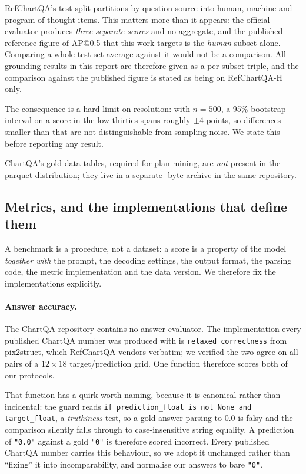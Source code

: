 RefChartQA's test split partitions by question source into  human, 
machine and  program-of-thought items. This matters more than it appears: the
official evaluator produces \emph{three separate scores} and no aggregate, and the published
reference figure of  AP@0.5 that this work targets is the \emph{human} subset alone.
Comparing a whole-test-set average against it would not be a comparison. All grounding results in
this report are therefore given as a per-subset triple, and the comparison against the published
figure is stated as being on RefChartQA-H only.

The consequence is a hard limit on resolution: with $n=500$, a 95\% bootstrap interval on a score in
the low thirties spans roughly $\pm4$ points, so differences smaller than that are not
distinguishable from sampling noise. We state this before reporting any result.

ChartQA's gold data tables, required for plan mining, are \emph{not} present in the parquet
distribution; they live in a separate -byte archive in the same repository.

\subsection{Metrics, and the implementations that define them}
\label{sec:setup:metrics}

A benchmark is a procedure, not a dataset: a score is a property of the model \emph{together with}
the prompt, the decoding settings, the output format, the parsing code, the metric implementation
and the data version. We therefore fix the implementations explicitly.

\paragraph{Answer accuracy.}
The ChartQA repository contains no answer evaluator. The implementation every published ChartQA
number was produced with is \texttt{relaxed\_correctness} from pix2struct, which RefChartQA vendors
verbatim; we verified the two agree on all  pairs of a $12\times18$ target/prediction
grid. One function therefore scores both of our protocols.

That function has a quirk worth naming, because it is canonical rather than incidental: the guard
reads \texttt{if prediction\_float is not None and target\_float}, a \emph{truthiness} test, so a
gold answer parsing to $0.0$ is falsy and the comparison silently falls through to case-insensitive
string equality. A prediction of \texttt{"0.0"} against a gold \texttt{"0"} is therefore scored
incorrect. Every published ChartQA number carries this behaviour, so we adopt it unchanged rather
than ``fixing'' it into incomparability, and normalise our answers to bare \texttt{"0"}.

